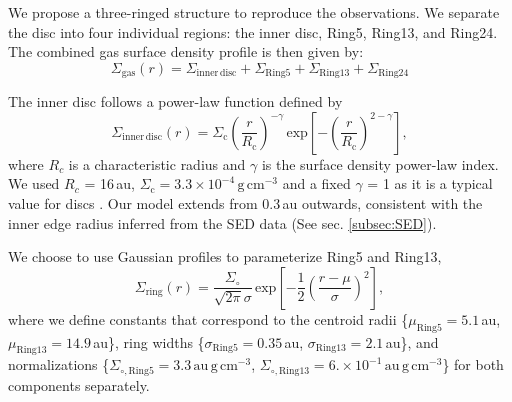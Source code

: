 \documentclass[fleqn,usenatbib,useAMS]{mnras}
\begin{document}
We propose a three-ringed structure to reproduce the observations. We separate the disc into four individual regions: the inner disc, Ring5, Ring13, and Ring24. The combined gas surface density profile is then given by:
\begin{equation}
  \Sigma_{\mathrm{gas}}(r) = \Sigma_{\mathrm{inner\,disc}} + \Sigma_{\mathrm{Ring5}} + \Sigma_{\mathrm{Ring13}} + \Sigma_{\mathrm{Ring24}}
\end{equation}

The inner disc follows a power-law function defined by
\begin{equation}
  \Sigma_{\mathrm{inner\,disc}}(r) =\Sigma_\mathrm{c} \left(\frac{r}{R_\mathrm{c}}\right)^{-\gamma}  \, \mathrm{exp}\left[-\left(\frac{r}{R_\mathrm{c}}\right)^{2-\gamma}\right],
\end{equation}
where $R_c$ is a characteristic radius and $\gamma$ is the surface density power-law index. We used $R_c$ = 16\,au, $\Sigma_\mathrm{c} =3.3\times10^{-4}$\,$\mathrm{g\,cm^{-3}}$ and a fixed $\gamma$ = 1 as it is a typical value for discs \citep{Andrews_2009,Andrews_2010}. Our model extends from 0.3\,au outwards, consistent with the inner edge radius inferred from the SED data (See sec. \ref{subsec:SED}).

We choose to use Gaussian profiles to parameterize Ring5 and Ring13,
\begin{equation}
  \Sigma_{\mathrm{ring}}(r) = \frac{\Sigma_\circ}{\sqrt{2 \pi} \sigma}
  \, \mathrm{exp}\left[-\frac{1}{2}\left(\frac{r-\mu}{\sigma}\right)^{2}\right],
\end{equation}
where we define constants that correspond to the centroid radii \{$\mu_{\mathrm{Ring5}}=5.1$\,au, $\mu_{\mathrm{Ring13}}=14.9$\,au\}, ring widths \{$\sigma_{\mathrm{Ring5}}=0.35$\,au, $\sigma_{\mathrm{Ring13}}=2.1$\,au\}, and normalizations \{$\Sigma_{\circ,\mathrm{Ring5}}=3.3$\,$\mathrm{au\,g\,cm^{-3}}$, $\Sigma_{\circ,\mathrm{Ring13}}=6. \times 10^{-1}$\,$\mathrm{au\,g\,cm^{-3}}$\} for both components separately.
\end{document}

